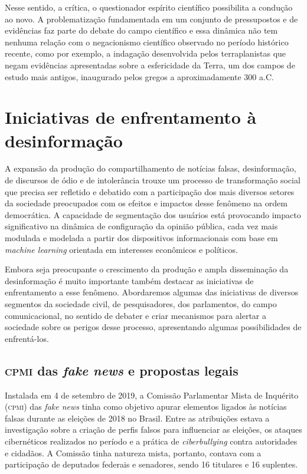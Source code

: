 Nesse sentido, a crítica, o questionador espírito científico
possibilita a condução ao novo. A problematização fundamentada em um
conjunto de pressupostos e de evidências faz parte do debate do campo
científico e essa dinâmica não tem nenhuma relação com o negacionismo
científico observado no período histórico recente, como por exemplo, a
indagação desenvolvida pelos terraplanistas que negam evidências
apresentadas sobre a esfericidade da Terra, um dos campos de estudo mais
antigos, inaugurado pelos gregos a aproximadamente 300 a.C.

\section{Iniciativas de enfrentamento à desinformação}

A expansão da produção do compartilhamento de notícias falsas,
desinformação, de discursos de ódio e de intolerância trouxe um processo
de transformação social que precisa ser refletido e debatido com a
participação dos mais diversos setores da sociedade preocupados com os
efeitos e impactos desse fenômeno na ordem democrática. A capacidade de
segmentação dos usuários está provocando impacto significativo na
dinâmica de configuração da opinião pública, cada vez mais modulada e
modelada a partir dos dispositivos informacionais com base em
\textit{machine learning} orientada em interesses econômicos e
políticos.

Embora seja preocupante o crescimento da produção e ampla disseminação
da desinformação é muito importante também destacar as iniciativas de
enfrentamento a esse fenômeno. Abordaremos algumas das iniciativas de
diversos segmentos da sociedade civil, de pesquisadores, dos
parlamentos, do campo comunicacional, no sentido de debater e criar
mecanismos para alertar a sociedade sobre os perigos desse processo,
apresentando algumas possibilidades de enfrentá-los.

\subsection{\textsc{\textsc{cpmi}} das \textit{fake news} e propostas legais}

Instalada em 4 de setembro de 2019, a Comissão Parlamentar Mista de
Inquérito (\textsc{cpmi}) das \textit{fake news} tinha como objetivo apurar elementos
ligados às notícias falsas durante as eleições de 2018 no Brasil. Entre
as atribuições estava a investigação sobre a criação de perfis falsos
para influenciar as eleições, os ataques cibernéticos realizados no
período e a prática de \textit{ciberbullying} contra autoridades e
cidadãos. A Comissão tinha natureza mista, portanto, contava com a
participação de deputados federais e senadores, sendo 16 titulares e 16
suplentes.

